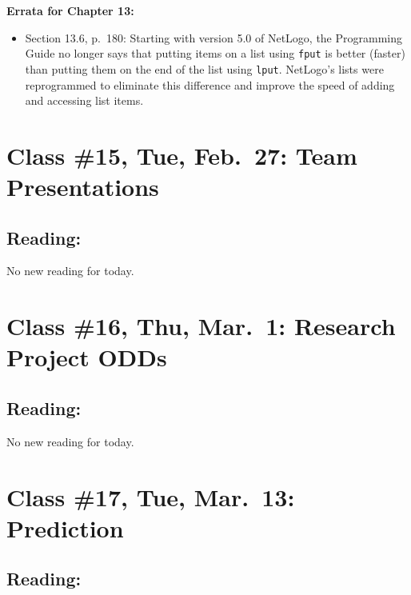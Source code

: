 \documentclass[]{article}
\providecommand{\tightlist}{%
  \setlength{\itemsep}{0pt}\setlength{\parskip}{0pt}}
\begin{document}
\textbf{Errata for Chapter 13:}

\begin{itemize}
\tightlist
\item
  Section 13.6, p.~180: Starting with version 5.0 of NetLogo, the
  Programming Guide no longer says that putting items on a list using
  \texttt{fput} is better (faster) than putting them on the end of the
  list using \texttt{lput}. NetLogo's lists were reprogrammed to
  eliminate this difference and improve the speed of adding and
  accessing list items.
\end{itemize}

\hypertarget{class-15-tue-feb.27-team-presentations}{%
\section{Class \#15, Tue, Feb.~27: Team
Presentations}\label{class-15-tue-feb.27-team-presentations}}

\hypertarget{reading-14}{%
\subsection{Reading:}\label{reading-14}}

No new reading for today.

\hypertarget{class-16-thu-mar.1-research-project-odds}{%
\section{Class \#16, Thu, Mar.~1: Research Project
ODDs}\label{class-16-thu-mar.1-research-project-odds}}

\hypertarget{reading-15}{%
\subsection{Reading:}\label{reading-15}}

No new reading for today.

\hypertarget{class-17-tue-mar.13-prediction}{%
\section{Class \#17, Tue, Mar.~13:
Prediction}\label{class-17-tue-mar.13-prediction}}

\hypertarget{reading-16}{%
\subsection{Reading:}\label{reading-16}}
\end{document}
